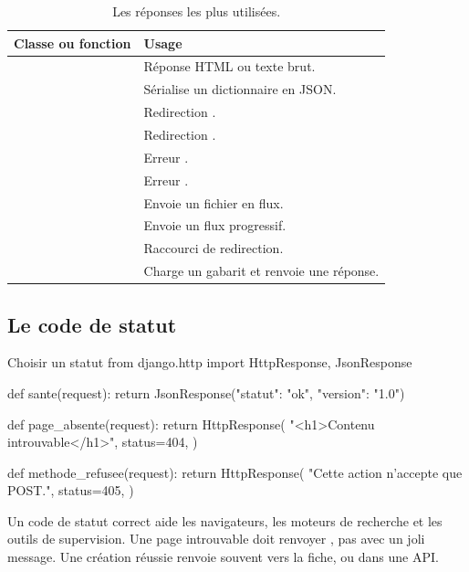 \begin{table}[htbp]
\centering
\small
\begin{tabularx}{\textwidth}{L{5.1cm} X}
\toprule
\textbf{Classe ou fonction} & \textbf{Usage} \\
\midrule
{} & Réponse HTML ou texte brut. \\
 & Sérialise un dictionnaire en JSON. \\
 & Redirection . \\
 & Redirection . \\
 & Erreur . \\
 & Erreur . \\
 & Envoie un fichier en flux. \\
 & Envoie un flux progressif. \\
 & Raccourci de redirection. \\
 & Charge un gabarit et renvoie une réponse. \\
\bottomrule
\end{tabularx}
\caption{Les réponses les plus utilisées.}
\end{table}

\subsection{Le code de statut}

\begin{codebox}[python]{Choisir un statut}
from django.http import HttpResponse, JsonResponse


def sante(request):
    return JsonResponse({"statut": "ok", "version": "1.0"})


def page_absente(request):
    return HttpResponse(
        "<h1>Contenu introuvable</h1>",
        status=404,
    )


def methode_refusee(request):
    return HttpResponse(
        "Cette action n'accepte que POST.",
        status=405,
    )
\end{codebox}

\begin{bonne}
Un code de statut correct aide les navigateurs, les moteurs de recherche et les
outils de supervision. Une page \og introuvable \fg{} doit renvoyer ,
pas  avec un joli message. Une création réussie renvoie souvent
 vers la fiche, ou  dans une API.
\end{bonne}


